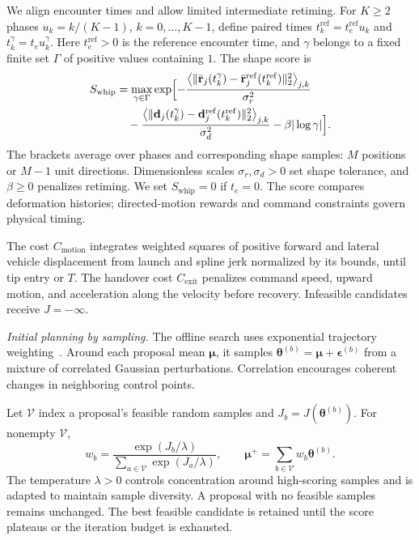 \documentclass[letterpaper, 10 pt, conference]{ieeeconf}
\begin{document}
We align encounter times and allow limited intermediate retiming.
For $K\geq2$ phases $u_k=k/(K-1)$, $k=0,\ldots,K-1$,
define paired times $t_k^{\mathrm{ref}}=t_e^{\mathrm{ref}}u_k$
and $t_k^\gamma=t_eu_k^\gamma$. Here $t_e^{\mathrm{ref}}>0$ is the
reference encounter time, and $\gamma$ belongs to a fixed finite
set $\Gamma$ of positive values containing $1$.
The shape score is
\begin{equation}
\begin{aligned}
S_{\mathrm{whip}}&=\max_{\gamma\in\Gamma}\exp\Bigl[
-\frac{\bigl\langle\|\bar{\mathbf r}_j(t_k^\gamma)
-\bar{\mathbf r}_j^{\mathrm{ref}}(t_k^{\mathrm{ref}})\|_2^2\bigr\rangle_{j,k}}{\sigma_r^2}\\
&\quad-\frac{\bigl\langle\|\mathbf d_j(t_k^\gamma)
-\mathbf d_j^{\mathrm{ref}}(t_k^{\mathrm{ref}})\|_2^2\bigr\rangle_{j,k}}{\sigma_d^2}
-\beta|\log\gamma|\Bigr].
\end{aligned}
\label{eq:whip_similarity}
\end{equation}
The brackets average over phases and corresponding shape
samples: $M$ positions or $M-1$ unit directions. Dimensionless scales
$\sigma_r,\sigma_d>0$ set shape tolerance, and $\beta\geq0$
penalizes retiming. We set $S_{\mathrm{whip}}=0$ if $t_e=0$.
The score compares deformation histories; directed-motion rewards
and command constraints govern physical timing.

The cost $C_{\mathrm{motion}}$ integrates weighted squares of
positive forward and lateral vehicle displacement from launch and
spline jerk normalized by its bounds, until tip entry or $T$. The handover cost
$C_{\mathrm{exit}}$ penalizes command speed, upward motion, and
acceleration along the velocity before recovery. Infeasible
candidates receive $J=-\infty$.

\noindent\emph{Initial planning by sampling.}
The offline search uses exponential trajectory
weighting~\cite{williams2017model}. Around each proposal mean
$\boldsymbol\mu$, it samples
$\boldsymbol\theta^{(b)}=\boldsymbol\mu+\boldsymbol\epsilon^{(b)}$
from a mixture of correlated Gaussian perturbations. Correlation
encourages coherent changes in neighboring control points.

Let $\mathcal V$ index a proposal's feasible random samples and
$J_b=J(\boldsymbol\theta^{(b)})$. For nonempty $\mathcal V$,
\begin{equation}
w_b=\frac{\exp(J_b/\lambda)}{\sum_{a\in\mathcal V}\exp(J_a/\lambda)},
\qquad
\boldsymbol\mu^+=\sum_{b\in\mathcal V}w_b\boldsymbol\theta^{(b)}.
\label{eq:offline_sampling_update}
\end{equation}
The temperature $\lambda>0$ controls concentration around
high-scoring samples and is adapted to maintain sample diversity.
A proposal with no feasible samples remains unchanged.
The best feasible candidate is retained until the score plateaus
or the iteration budget is exhausted.
\end{document}
